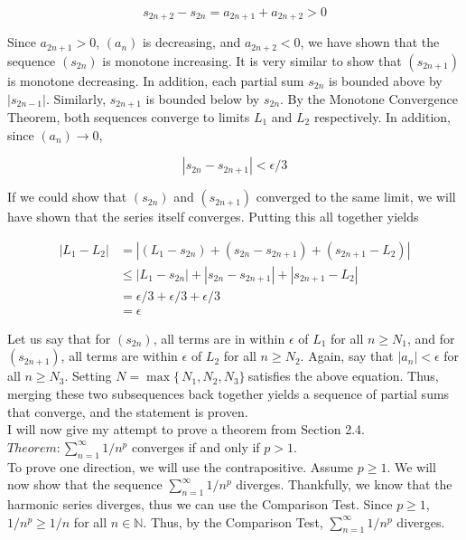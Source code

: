 \documentclass{article}
\begin{document}
\begin{equation}
    s_{2n+2} - s_{2n} = a_{2n+1} + a_{2n+2} > 0
\end{equation}

Since $a_{2n+1} > 0$, $(a_n)$ is decreasing, and $a_{2n+2} < 0$, we have shown that the sequence $(s_{2n})$ is monotone increasing. It is very similar to show that $(s_{2n+1})$ is monotone decreasing. In addition, each partial sum $s_{2n}$ is bounded above by $|s_{2n-1}|$. Similarly, $s_{2n+1}$ is bounded below by $s_{2n}$. By the Monotone Convergence Theorem, both sequences converge to limits $L_1$ and $L_2$ respectively. In addition, since $(a_n) \rightarrow 0$, 

\begin{equation}
    |s_{2n} - s_{2n+1}| < \epsilon / 3
\end{equation}

If we could show that $(s_{2n})$ and $(s_{2n+1})$ converged to the same limit, we will have shown that the series itself converges. Putting this all together yields 

\begin{equation}
\begin{split}
    |L_1 - L_2| & = | (L_1 - s_{2n}) + (s_{2n} - s_{2n+1}) + (s_{2n+1} - L_2) | \\ 
    & \leq |L_1 - s_{2n}| + |s_{2n} - s_{2n+1}| + |s_{2n+1} - L_2| \\
    & = \epsilon / 3 +  \epsilon / 3 +  \epsilon / 3  \\
    & = \epsilon
\end{split}
\end{equation}

Let us say that for $(s_{2n})$, all terms are in within $\epsilon$ of $L_1$ for all $n \ge N_1$, and for $(s_{2n+1})$, all terms are within $\epsilon$ of $L_2$ for all $n \ge N_2$. Again, say that $|a_n| < \epsilon$ for all $n \ge N_3$. Setting $N = \max \{\,N_1, N_2, N_3\}\ $satisfies the above equation. Thus, merging these two subsequences back together yields a sequence of partial sums that converge, and the statement is proven. \\

I will now give my attempt to prove a theorem from Section 2.4. \\

$Theorem: \sum_{n=1}^{\infty} 1/n^p$ converges if and only if $p > 1$. \\

To prove one direction, we will use the contrapositive. Assume $p \ge 1$. We will now show that the sequence $\sum_{n=1}^{\infty} 1/n^p$ diverges. Thankfully, we know that the harmonic series diverges, thus we can use the Comparison Test. Since $p \ge 1$, $ 1/n^p \ge 1/n$ for all $n \in \mathbb{N}$. Thus, by the Comparison Test, $\sum_{n=1}^{\infty} 1/n^p$ diverges. \\
\end{document}

